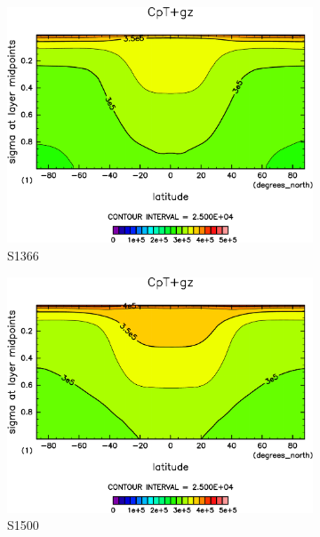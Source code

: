 \documentclass[body]{subfiles}
\begin{document}
\begin{figure}[t]
	\centering
	\begin{subfigure}{.4\textwidth}
		\centering
		\includegraphics[width=\textwidth]{S1366/CpT+gz,time=14600:14965-crop-rotate.pdf}
		\caption{S1366}\label{CpT+gzS1366}
	\end{subfigure}
	\begin{subfigure}{.4\textwidth}
		\centering
		\includegraphics[width=\textwidth]{S1500/CpT+gz,time=3650:4015-crop-rotate.pdf}
		\caption{S1500}\label{CpT+gzS1500}
	\end{subfigure}
	\begin{subfigure}{.4\textwidth}
		\centering

\end{subfigure}
\end{figure}
\end{document}
